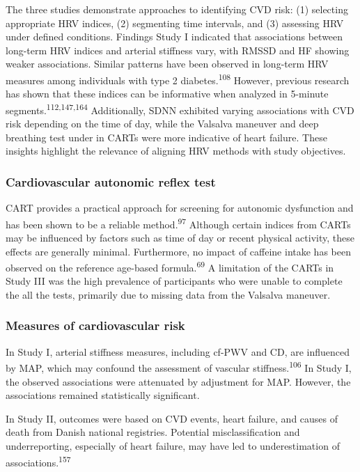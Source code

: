 \documentclass[
  a4paper,
  headsepline=true,
  open=left]{scrbook}
\begin{document}
The three studies demonstrate approaches to identifying CVD risk: (1)
selecting appropriate HRV indices, (2) segmenting time intervals, and
(3) assessing HRV under defined conditions. Findings Study I indicated
that associations between long-term HRV indices and arterial stiffness
vary, with RMSSD and HF showing weaker associations. Similar patterns
have been observed in long-term HRV measures among individuals with type
2 diabetes.\textsuperscript{108} However, previous research has shown
that these indices can be informative when analyzed in 5-minute
segments.\textsuperscript{112,147,164} Additionally, SDNN exhibited
varying associations with CVD risk depending on the time of day, while
the Valsalva maneuver and deep breathing test under in CARTs were more
indicative of heart failure. These insights highlight the relevance of
aligning HRV methods with study objectives.

\hypertarget{cardiovascular-autonomic-reflex-test}{%
\subsubsection{Cardiovascular autonomic reflex
test}\label{cardiovascular-autonomic-reflex-test}}

CART provides a practical approach for screening for autonomic
dysfunction and has been shown to be a reliable
method.\textsuperscript{97} Although certain indices from CARTs may be
influenced by factors such as time of day or recent physical activity,
these effects are generally minimal. Furthermore, no impact of caffeine
intake has been observed on the reference age-based
formula.\textsuperscript{69} A limitation of the CARTs in Study III was
the high prevalence of participants who were unable to complete the all
the tests, primarily due to missing data from the Valsalva maneuver.

\hypertarget{measures-of-cardiovascular-risk}{%
\subsubsection{Measures of cardiovascular
risk}\label{measures-of-cardiovascular-risk}}

In Study I, arterial stiffness measures, including cf-PWV and CD, are
influenced by MAP, which may confound the assessment of vascular
stiffness.\textsuperscript{106} In Study I, the observed associations
were attenuated by adjustment for MAP. However, the associations
remained statistically significant.

In Study II, outcomes were based on CVD events, heart failure, and
causes of death from Danish national registries. Potential
misclassification and underreporting, especially of heart failure, may
have led to underestimation of associations.\textsuperscript{157}
\end{document}
